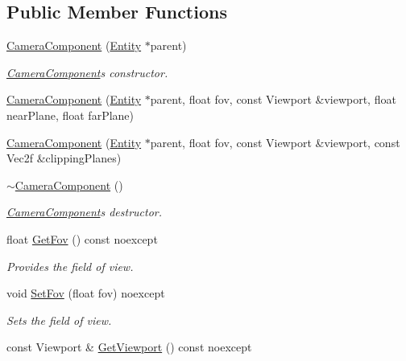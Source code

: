 \subsection*{Public Member Functions}
\begin{DoxyCompactItemize}
\item 
\hyperlink{class_blade_1_1_camera_component_a6f66ead0c16432f9840070d40236f099}{Camera\+Component} (\hyperlink{class_blade_1_1_entity}{Entity} $\ast$parent)
\begin{DoxyCompactList}\small\item\em \hyperlink{class_blade_1_1_camera_component}{Camera\+Component}\textquotesingle{}s constructor. \end{DoxyCompactList}\item 
\hyperlink{class_blade_1_1_camera_component_aeb0111051de5e6156dde78ec88cf5afe}{Camera\+Component} (\hyperlink{class_blade_1_1_entity}{Entity} $\ast$parent, float fov, const Viewport \&viewport, float near\+Plane, float far\+Plane)
\item 
\hyperlink{class_blade_1_1_camera_component_ab34dcc016e588bb1b5316e1fd06d9246}{Camera\+Component} (\hyperlink{class_blade_1_1_entity}{Entity} $\ast$parent, float fov, const Viewport \&viewport, const Vec2f \&clipping\+Planes)
\item 
\hyperlink{class_blade_1_1_camera_component_ab0efd673adcb54e7464accfbe80bb612}{$\sim$\+Camera\+Component} ()
\begin{DoxyCompactList}\small\item\em \hyperlink{class_blade_1_1_camera_component}{Camera\+Component}\textquotesingle{}s destructor. \end{DoxyCompactList}\item 
float \hyperlink{class_blade_1_1_camera_component_a74c21029f3b9cc3964e87ef048eebe90}{Get\+Fov} () const noexcept
\begin{DoxyCompactList}\small\item\em Provides the field of view. \end{DoxyCompactList}\item 
void \hyperlink{class_blade_1_1_camera_component_a7d3b2934f93bdb601b177c23e9c1088f}{Set\+Fov} (float fov) noexcept
\begin{DoxyCompactList}\small\item\em Sets the field of view. \end{DoxyCompactList}\item 
const Viewport \& \hyperlink{class_blade_1_1_camera_component_a3ddce5974c61927eb3bb06f2381d780e}{Get\+Viewport} () const noexcept

\end{DoxyCompactItemize}
